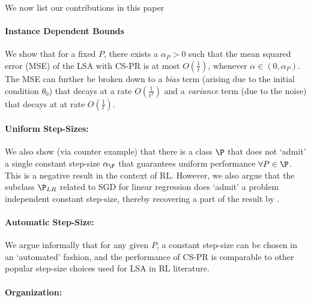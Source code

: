 We now list our contributions in this paper
\paragraph{Instance Dependent Bounds} We show that for a fixed $P$, there exists a $\alpha_P>0$ such that the mean squared error (MSE) of the LSA with CS-PR is at most $O(\frac{1}{t})$, whenever $\alpha\in (0,\alpha_P)$. The MSE can further be broken down to a \emph{bias} term (arising due to the initial condition $\theta_0$) that decays at a rate $O(\frac{1}{t^2})$ and a \emph{variance} term (due to the noise) that decays at at rate $O(\frac{1}{t})$.
\paragraph{Uniform Step-Sizes:} We also show (via counter example) that there is a class $\P$ that does not `admit' a single constant step-size $\alpha_{\P}$ that guarantees uniform performance $\forall P\in \P$. This is a negative result in the context of RL. However,
we also argue that the subclass $\P_{LR}$ related to SGD for linear regression does `admit' a problem independent constant step-size, thereby recovering a part of the result by \citet{bach}.
\paragraph{Automatic Step-Size:} We argue informally that for any given $P$, a constant step-size can be chosen in an `automated' fashion, and the performance of CS-PR is comparable to other popular step-size choices used for LSA in RL literature.
\paragraph{Organization:}
